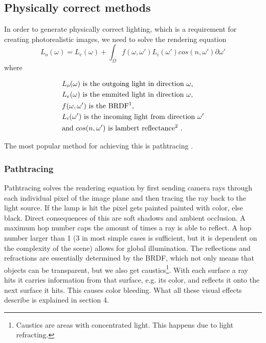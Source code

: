 \documentclass{ACGSeminar}
\begin{document}
	\subsection{Physically correct methods}
	In order to generate physically correct lighting, which is a requirement for creating photorealistic images, we need to solve the rendering equation
	$$ L_o(\omega) = L_e(\omega) + \int_\Omega f(\omega, \omega')L_i(\omega')cos(n, \omega') \partial \omega' $$
	where 
	\begin{center}
		\begin{align*}
			&L_o(\omega) \text{ is the outgoing light in direction } \omega\text{,}\\
			&L_e(\omega) \text{ is the emmited light in direction } \omega\text{,}\\
			&f(\omega, \omega') \text{ is the BRDF\footnotemark} \text{,}\\
			&L_i(\omega') \text{ is the incoming light from direction } \omega'\\
			&\text{and } cos(n, \omega') \text{ is lambert reflectance\footnotemark}  \text{ .}
		\end{align*}
	\end{center}
	\addtocounter{footnote}{-1}
	The most popular method for achieving this is pathtracing \cite{P2PATH}.
	\subsubsection{Pathtracing}
		Pathtracing solves the rendering equation by first sending camera rays through each individual pixel of the image plane and then tracing the ray back to the light source. If the lamp is hit the pixel gets painted painted with color, else black. Direct consequences of this are soft shadows and ambient occlusion. A maximum hop number caps the amount of times a ray is able to reflect. A hop number larger than 1 (3 in most simple cases is sufficient, but it is dependent on the complexity of the scene) allows for global illumination. The reflections and refractions are essentially determined by the BRDF, which not only means that objects can be transparent, but we also get caustics\footnote{Caustics are areas with concentrated light. This happens due to light refracting.}. With each surface a ray hits it carries information from that surface, e.g. its color, and reflects it onto the next surface it hits. This causes color bleeding. What all these visual effects describe is explained in section 4.
\end{document}
